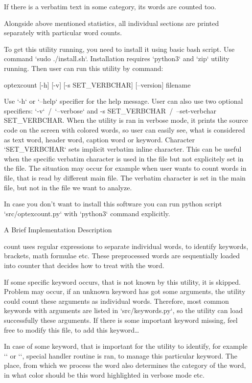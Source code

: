 If there is a verbatim text in some category, its words are counted too.

Alongside above mentioned statistics, all individual sections are printed separately with particular word counts.

To get this utility running, you need to install it using basic bash script.
Use command {\Blue `sudo ./install.sh`}.
Installation requires `python3` and `zip` utility running.
Then user can run this utility by command:

\begtt
optexcount [-h] [-v] [-s SET_VERBCHAR] [--version] filename
\endtt

Use {\Blue `-h`} or {\Blue `--help`} specifier for the help message.
User can also use two optional specifiers: {\Blue `-v`}~/~{\Blue `--verbose`} and {\Blue -s SET_VERBCHAR}~/~{\Blue --set-verbchar SET_VERBCHAR}.
When the utility is ran in verbose mode, it prints the source code on the screen with colored words, so user can easily see, what is considered as text word, header word, caption word or keyword.
Character {\Blue `SET_VERBCHAR`} sets implicit verbatim inline character.
This can be useful when the specific verbatim character is used in the file but not explicitely set in the file.
The situation may occur for example when user wants to count words in file, that is read by different main file.
The verbatim character is set in the main file, but not in the file we want to analyze.

In case you don't want to install this software you can run python script {\Blue `src/optexcount.py`} with {\Blue `python3`} command explicitly.

\sec A Brief Implementation Description

\OpTeX count uses regular expressions to separate individual words, to identify keywords, brackets, math formulae etc.
These preprocessed words are sequentially loaded into counter that decides how to treat with the word.

If some specific keyword occurs, that is not known by this utility, it is skipped.
Problem may occur, if an unknown keyword has got some arguments, the utility could count these arguments as individual words.
Therefore, most common keywords with arguments are listed in `src/keywords.py`, so the utility can load successfully these arguments.
If there is some important keyword missing, feel free to modify this file, to add this keyword\dots

In case of some keyword, that is important for the utility to identify, for example {\Blue `\sec`} or {\Blue `\fnote`}, special handler routine is ran, to manage this particular keyword.
The place, from which we process the word also determines the category of the word, in what color should be this word highlighted in verbose mode etc.


